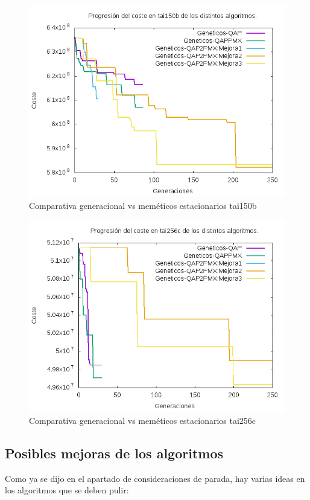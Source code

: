 \begin{figure}[H]
\centering
\includegraphics[width=0.7\linewidth]{graficos/comparativaGeneracionaltai150b}
\caption{Comparativa generacional vs meméticos estacionarios tai150b}
\label{fig:comparativaGeneracionaltai150b}
\end{figure}

\begin{figure}[H]
\centering
\includegraphics[width=0.7\linewidth]{graficos/comparativaGeneracionaltai256c}
\caption{Comparativa generacional vs meméticos estacionarios tai256c}
\label{fig:comparativaGeneracionaltai256c}
\end{figure}

\subsection{Posibles mejoras de los algoritmos}

Como ya se dijo en el apartado de consideraciones de parada, hay varias ideas en los algoritmos que se deben pulir:\\

